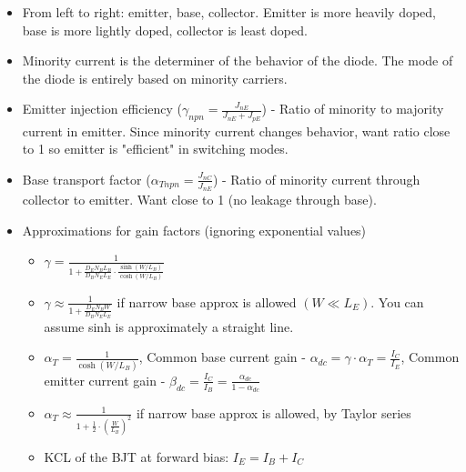 \documentclass{article}
\begin{document}
\begin{itemize}
    \item From left to right: emitter, base, collector. Emitter is more heavily doped, base is more lightly doped, collector is least doped.
    \item Minority current is the determiner of the behavior of the diode. The mode of the diode is entirely based on minority carriers.
    \item Emitter injection efficiency ($\gamma_{npn} = \frac{J_{nE}}{J_{nE} + J_{pE}}$) - Ratio of minority to majority current in emitter. Since minority current changes behavior, want ratio close to 1 so emitter is "efficient" in switching modes.
    \item Base transport factor ($\alpha_{Tnpn} = \frac{J_{nC}}{J_{nE}}$) - Ratio of minority current through collector to emitter. Want close to 1 (no leakage through base).
    \item Approximations for gain factors (ignoring exponential values)
    \begin{itemize}
        \item $\gamma = \frac{1}{1 + \frac{D_E N_B L_B}{D_B N_E L_E} \cdot \frac{\sinh(W / L_B)}{\cosh(W / L_B)}}$
        \item $\gamma \approx \frac{1}{1 + \frac{D_E N_B W}{D_B N_E L_E}}$ if narrow base approx is allowed $(W \ll L_E)$. You can assume sinh is approximately a straight line.
        \item $\alpha_T = \frac{1}{\cosh(W / L_B)}$, Common base current gain - $\alpha_{dc} = \gamma \cdot \alpha_T = \frac{I_C}{I_E}$, Common emitter current gain - $\beta_{dc} = \frac{I_C}{I_B} = \frac{\alpha_{dc}}{1 - \alpha_{dc}}$
        \item $\alpha_T \approx \frac{1}{1 + \frac{1}{2} \cdot \left(\frac{W}{L_B}\right)^2}$ if narrow base approx is allowed, by Taylor series
        \item KCL of the BJT at forward bias: $I_E = I_B + I_C$
    \end{itemize}
\end{itemize}
\end{document}
